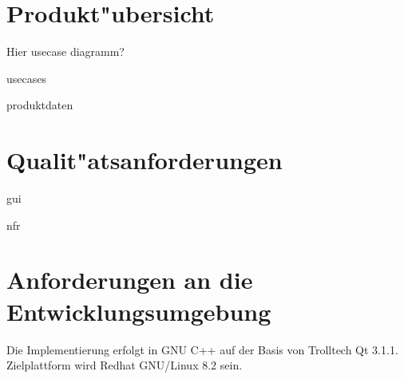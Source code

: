 \documentclass[a4paper,titlepage,12pt,ngerman]{scrbook}
\begin{document}

\chapter {Produkt"ubersicht}
Hier usecase diagramm?

 {usecases}

 {produktdaten}

\chapter {Qualit"atsanforderungen}

 {gui}

 {nfr}

\chapter {Anforderungen an die Entwicklungsumgebung}
Die Implementierung erfolgt in GNU C++ auf der Basis von Trolltech Qt 3.1.1. Zielplattform wird Redhat GNU/Linux 8.2 sein.
\end{document}
